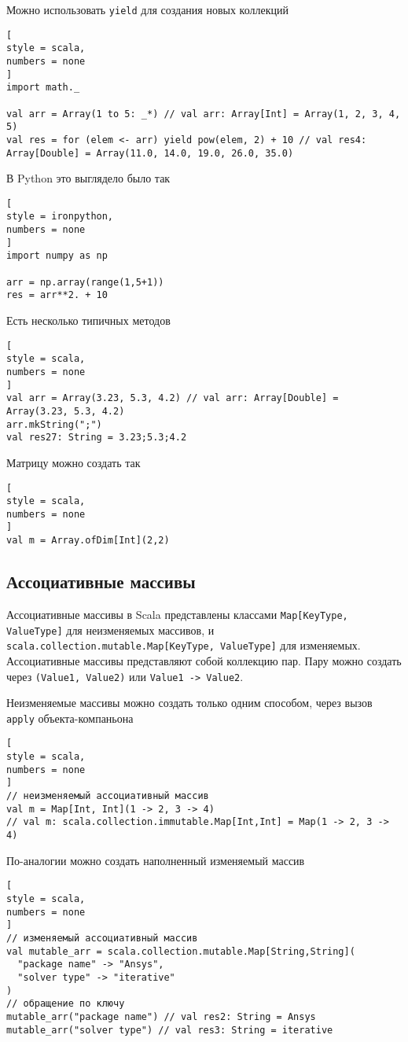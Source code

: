 \documentclass[%
	11pt,
	a4paper,
	utf8,
		]{article}
\begin{document}
Можно использовать \texttt{yield} для создания новых коллекций
\begin{lstlisting}[
style = scala,
numbers = none
]
import math._

val arr = Array(1 to 5: _*) // val arr: Array[Int] = Array(1, 2, 3, 4, 5)
val res = for (elem <- arr) yield pow(elem, 2) + 10 // val res4: Array[Double] = Array(11.0, 14.0, 19.0, 26.0, 35.0)
\end{lstlisting}

В Python это выглядело было так
\begin{lstlisting}[
style = ironpython,
numbers = none
]
import numpy as np

arr = np.array(range(1,5+1))
res = arr**2. + 10
\end{lstlisting}

Есть несколько типичных методов
\begin{lstlisting}[
style = scala,
numbers = none
]
val arr = Array(3.23, 5.3, 4.2) // val arr: Array[Double] = Array(3.23, 5.3, 4.2)
arr.mkString(";")
val res27: String = 3.23;5.3;4.2
\end{lstlisting}

Матрицу можно создать так
\begin{lstlisting}[
style = scala,
numbers = none
]
val m = Array.ofDim[Int](2,2)
\end{lstlisting}

\subsection{Ассоциативные массивы}

Ассоциативные массивы в Scala представлены классами \texttt{Map[KeyType, ValueType]} для неизменяемых массивов, и \texttt{scala.collection.mutable.Map[KeyType, ValueType]} для изменяемых. Ассоциативные массивы представляют собой коллекцию пар. Пару можно создать через \texttt{(Value1, Value2)} или \texttt{Value1 -> Value2}.

Неизменяемые массивы можно создать только одним способом, через вызов \texttt{apply} объекта-компаньона
\begin{lstlisting}[
style = scala,
numbers = none
]
// неизменяемый ассоциативный массив
val m = Map[Int, Int](1 -> 2, 3 -> 4)
// val m: scala.collection.immutable.Map[Int,Int] = Map(1 -> 2, 3 -> 4)
\end{lstlisting}

По-аналогии можно создать наполненный изменяемый массив
\begin{lstlisting}[
style = scala,
numbers = none
]
// изменяемый ассоциативный массив
val mutable_arr = scala.collection.mutable.Map[String,String](
  "package name" -> "Ansys",
  "solver type" -> "iterative"
)
// обращение по ключу
mutable_arr("package name") // val res2: String = Ansys
mutable_arr("solver type") // val res3: String = iterative
\end{lstlisting}
\end{document}
